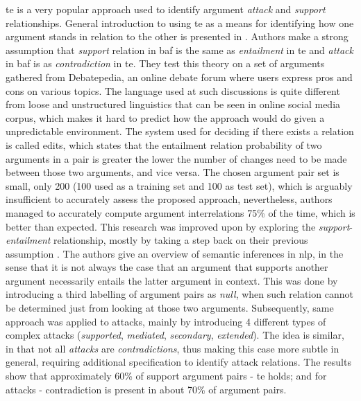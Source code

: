         \gls{te} is a very popular approach used to identify argument \textit{attack} and \textit{support} relationships. General introduction to using \gls{te} as a means for identifying how one argument stands in relation to the other is presented in \autocite{Cabrio2012NaturalLA, Cabrio2012CombiningTE}. Authors make a strong assumption that \textit{support} relation in \gls{baf} is the same as \textit{entailment} in \gls{te} and \textit{attack} in \gls{baf} is as \textit{contradiction} in \gls{te}. They test this theory on a set of arguments gathered from Debatepedia, an online debate forum where users express pros and cons on various topics. The language used at such discussions is quite different from loose and unstructured linguistics that can be seen in online social media corpus, which makes it hard to predict how the approach would do given a unpredictable environment. The system used for deciding if there exists a relation is called \gls{edits}, which states that the entailment relation probability of two arguments in a pair is greater the lower the number of changes need to be made between those two arguments, and vice versa. The chosen argument pair set is small, only 200 (100 used as a training set and 100 as test set), which is arguably insufficient to accurately assess the proposed approach, nevertheless, authors managed to accurately compute argument interrelations 75\% of the time, which is better than expected. This research was improved upon by exploring the \textit{support}-\textit{entailment} relationship, mostly by taking a step back on their previous assumption \autocite{Cabrio2013ANL, Cabrio2013DetectingBS}. The authors give an overview of semantic inferences in \gls{nlp}, in the sense that it is not always the case that an argument that supports another argument necessarily entails the latter argument in context. This was done by introducing a third labelling of argument pairs as \textit{null}, when such relation cannot be determined just from looking at those two arguments. Subsequently, same approach was applied to attacks, mainly by introducing 4 different types of complex attacks (\textit{supported}, \textit{mediated}, \textit{secondary}, \textit{extended}). The idea is similar, in that not all \textit{attacks} are \textit{contradictions}, thus making this case more subtle in general, requiring additional specification to identify attack relations. The results show that approximately 60\% of support argument pairs - \gls{te} holds; and for attacks - contradiction is present in about 70\% of argument pairs.
        
